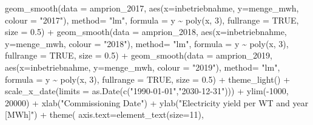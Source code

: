 \documentclass[a4paper,11pt]{article}
\newenvironment{Shaded}{\begin{snugshade}}{\end{snugshade}}
\newcommand{\AttributeTok}[1]{\textcolor[rgb]{0.77,0.63,0.00}{#1}}
\newcommand{\ConstantTok}[1]{\textcolor[rgb]{0.00,0.00,0.00}{#1}}
\newcommand{\DecValTok}[1]{\textcolor[rgb]{0.00,0.00,0.81}{#1}}
\newcommand{\FloatTok}[1]{\textcolor[rgb]{0.00,0.00,0.81}{#1}}
\newcommand{\FunctionTok}[1]{\textcolor[rgb]{0.00,0.00,0.00}{#1}}
\newcommand{\NormalTok}[1]{#1}
\newcommand{\SpecialCharTok}[1]{\textcolor[rgb]{0.00,0.00,0.00}{#1}}
\newcommand{\StringTok}[1]{\textcolor[rgb]{0.31,0.60,0.02}{#1}}
\begin{document}
\begin{Shaded}
\begin{Highlighting}[]
  \FunctionTok{geom\_smooth}\NormalTok{(}\AttributeTok{data =}\NormalTok{ amprion\_2017, }
              \FunctionTok{aes}\NormalTok{(}\AttributeTok{x=}\NormalTok{inbetriebnahme, }\AttributeTok{y=}\NormalTok{menge\_mwh, }\AttributeTok{colour =} \StringTok{"2017"}\NormalTok{), }
              \AttributeTok{method=} \StringTok{"lm"}\NormalTok{, }\AttributeTok{formula =}\NormalTok{ y }\SpecialCharTok{\textasciitilde{}} \FunctionTok{poly}\NormalTok{(x, }\DecValTok{3}\NormalTok{), }
              \AttributeTok{fullrange =} \ConstantTok{TRUE}\NormalTok{, }\AttributeTok{size =} \FloatTok{0.5}\NormalTok{)  }\SpecialCharTok{+}
  \FunctionTok{geom\_smooth}\NormalTok{(}\AttributeTok{data =}\NormalTok{ amprion\_2018, }
              \FunctionTok{aes}\NormalTok{(}\AttributeTok{x=}\NormalTok{inbetriebnahme, }\AttributeTok{y=}\NormalTok{menge\_mwh, }\AttributeTok{colour =} \StringTok{"2018"}\NormalTok{), }
              \AttributeTok{method=} \StringTok{"lm"}\NormalTok{, }\AttributeTok{formula =}\NormalTok{ y }\SpecialCharTok{\textasciitilde{}} \FunctionTok{poly}\NormalTok{(x, }\DecValTok{3}\NormalTok{), }
              \AttributeTok{fullrange =} \ConstantTok{TRUE}\NormalTok{, }\AttributeTok{size =} \FloatTok{0.5}\NormalTok{)  }\SpecialCharTok{+}
  \FunctionTok{geom\_smooth}\NormalTok{(}\AttributeTok{data =}\NormalTok{ amprion\_2019, }
              \FunctionTok{aes}\NormalTok{(}\AttributeTok{x=}\NormalTok{inbetriebnahme, }\AttributeTok{y=}\NormalTok{menge\_mwh, }\AttributeTok{colour =} \StringTok{"2019"}\NormalTok{), }
              \AttributeTok{method=} \StringTok{"lm"}\NormalTok{, }\AttributeTok{formula =}\NormalTok{ y }\SpecialCharTok{\textasciitilde{}} \FunctionTok{poly}\NormalTok{(x, }\DecValTok{3}\NormalTok{), }
              \AttributeTok{fullrange =} \ConstantTok{TRUE}\NormalTok{, }\AttributeTok{size =} \FloatTok{0.5}\NormalTok{)  }\SpecialCharTok{+}
  \FunctionTok{theme\_light}\NormalTok{() }\SpecialCharTok{+}
  \FunctionTok{scale\_x\_date}\NormalTok{(}\AttributeTok{limits =} \FunctionTok{as.Date}\NormalTok{(}\FunctionTok{c}\NormalTok{(}\StringTok{"1990{-}01{-}01"}\NormalTok{,}\StringTok{"2030{-}12{-}31"}\NormalTok{))) }\SpecialCharTok{+}
  \FunctionTok{ylim}\NormalTok{(}\SpecialCharTok{{-}}\DecValTok{1000}\NormalTok{, }\DecValTok{20000}\NormalTok{) }\SpecialCharTok{+}
  \FunctionTok{xlab}\NormalTok{(}\StringTok{"Commissioning Date"}\NormalTok{) }\SpecialCharTok{+}
  \FunctionTok{ylab}\NormalTok{(}\StringTok{"Electricity yield per WT and year [MWh]"}\NormalTok{) }\SpecialCharTok{+}
  \FunctionTok{theme}\NormalTok{( }\AttributeTok{axis.text=}\FunctionTok{element\_text}\NormalTok{(}\AttributeTok{size=}\DecValTok{11}\NormalTok{),}

\end{Highlighting}
\end{Shaded}
\end{document}
